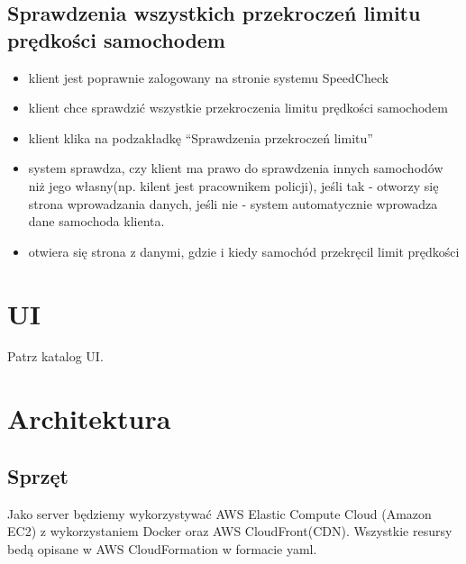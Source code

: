 \documentclass[12pt]{article}
\begin{document}
	\subsection{Sprawdzenia wszystkich przekroczeń limitu prędkości samochodem}
	\begin{itemize}
	\item klient jest poprawnie zalogowany na stronie systemu SpeedCheck
	\item klient chce sprawdzić wszystkie przekroczenia limitu prędkości samochodem
	\item klient klika na podzakładkę “Sprawdzenia przekroczeń limitu”
	\item system sprawdza, czy klient ma prawo do sprawdzenia innych samochodów niż jego własny(np. kilent 	jest pracownikem policji), jeśli tak - otworzy się strona wprowadzania danych, jeśli nie - system automatycznie wprowadza dane samochoda klienta.
	\item otwiera się strona z danymi, gdzie i kiedy samochód przekręcil limit prędkości
	\end{itemize}
	
\section{UI}
Patrz katalog UI.

\section{Architektura}

\subsection{Sprzęt}
	Jako server będziemy wykorzystywać AWS Elastic Compute Cloud (Amazon EC2) z 			wykorzystaniem Docker oraz AWS CloudFront(CDN). Wszystkie resursy bedą opisane w AWS 			CloudFormation w formacie yaml.
    
\end{document}
